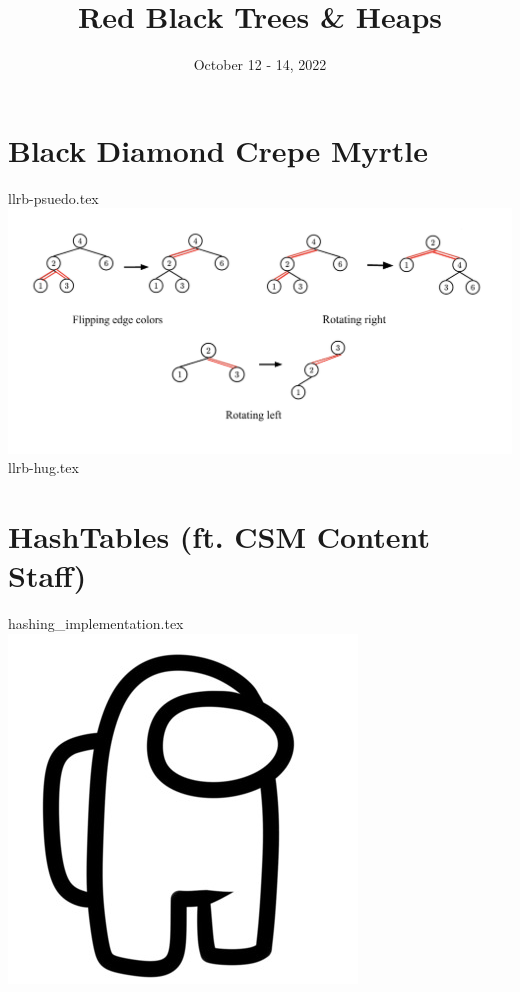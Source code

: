 \documentclass[11pt]{exam}
\title{Red Black Trees \& Heaps}
\date{October 12 - 14, 2022}
\begin{document}
\maketitle


\section{Black Diamond Crepe Myrtle}
\begin{questions}
{llrb-psuedo.tex}
\includegraphics[scale=.8]{images/llrb_examples.png}
\clearpage
{llrb-hug.tex}
\end{questions}


\pagebreak
\section{HashTables (ft. CSM Content Staff)}
\begin{questions}
{hashing_implementation.tex}
\includegraphics[scale=.025]{images/sus.png}
\end{questions}
\end{document}
